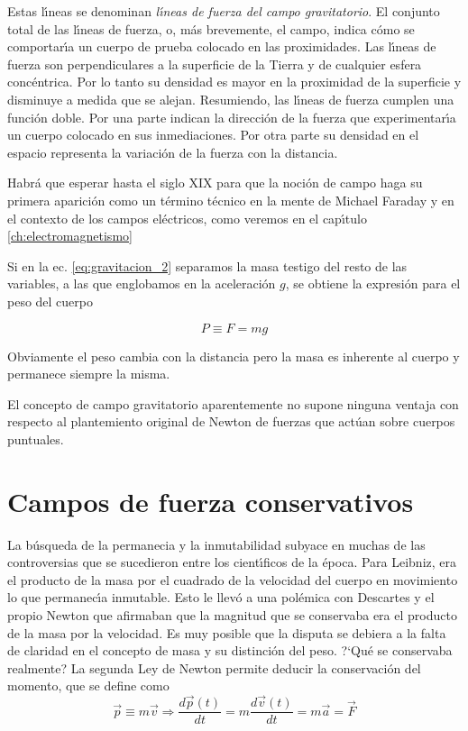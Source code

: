Estas l\'\i{}neas se denominan \emph{l\'\i{}neas de fuerza del campo gravitatorio}. El conjunto total de las l\'\i{}neas de fuerza, o, m\'as brevemente, el campo, indica c\'omo se comportar\'\i{}a un cuerpo de prueba colocado en las proximidades. Las l\'\i{}neas de fuerza son perpendiculares a la superficie de la Tierra y de cualquier esfera conc\'entrica. Por lo tanto su densidad es mayor en la proximidad de la superficie y disminuye a medida que se alejan. Resumiendo, las l\'\i{}neas de fuerza cumplen una funci\'on doble. Por una parte indican la direcci\'on de la fuerza que experimentar\'\i{}a un cuerpo colocado en sus inmediaciones. Por otra parte su densidad en el espacio representa la variaci\'on de la fuerza con la distancia. 

Habr\'a que esperar hasta el siglo XIX para que la noci\'on de campo haga su primera aparici\'on como un t\'ermino t\'ecnico en la mente de Michael Faraday y en el contexto de los campos el\'ectricos, como veremos en el cap\'\i{}tulo \ref{ch:electromagnetismo}


Si en la ec. \ref{eq:gravitacion_2} separamos la masa testigo del resto de las variables, a las que englobamos en la aceleraci\'on $g$, se obtiene la expresi\'on para el peso del cuerpo

\begin{equation}
P \equiv F=mg 
\label{eq:definicion_peso}
\end{equation}

Obviamente el peso cambia con la distancia pero la masa es inherente al cuerpo y permanece siempre la misma.


El concepto de campo gravitatorio aparentemente no supone ninguna ventaja con respecto al plantemiento original de Newton de fuerzas que act\'uan sobre cuerpos puntuales. 



\section{Campos de fuerza conservativos}
La b\'usqueda de la permanecia y la inmutabilidad subyace en muchas de las controversias que se sucedieron entre los cient\'\i{}ficos de la \'epoca. Para Leibniz, era el producto de la masa por el cuadrado de la velocidad del cuerpo en movimiento lo que permanec\'\i{}a inmutable. Esto le llev\'o a una pol\'emica con Descartes y el propio Newton que afirmaban que la magnitud que se conservaba era el producto de la masa por la velocidad\cite{Cajori1899}. Es muy posible que la disputa se debiera a la falta de claridad en el concepto de masa y su distinci\'on del peso. ?`Qu\'e se conservaba realmente? La segunda Ley de Newton permite deducir la conservaci\'on del momento, que se define como
\begin{equation}
\vec{p}\equiv m\vec{v}\Rightarrow\frac{d\vec{p}(t)}{dt}=m\frac{d\vec{v}(t)}{dt}=m\vec{a}=\vec{F}
\label{eq:definicion_momento}
\end{equation}


